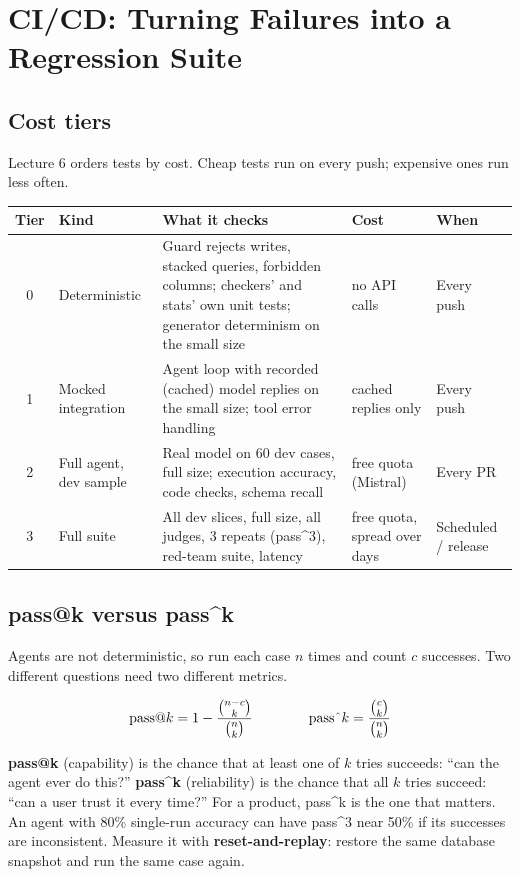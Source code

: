 \documentclass[11pt,a4paper]{article}
\begin{document}
\section{CI/CD: Turning Failures into a Regression Suite}

\subsection{Cost tiers}

Lecture 6 orders tests by cost. Cheap tests run on every push; expensive ones run less often.

\begin{center}
\small
\begin{tabularx}{\linewidth}{@{}c l X l l@{}}
\toprule
\textbf{Tier} & \textbf{Kind} & \textbf{What it checks} & \textbf{Cost} & \textbf{When}\\
\midrule
0 & Deterministic & Guard rejects writes, stacked queries, forbidden columns; checkers' and stats' own unit tests; generator determinism on the small size & no API calls & Every push\\
1 & Mocked integration & Agent loop with recorded (cached) model replies on the small size; tool error handling & cached replies only & Every push\\
2 & Full agent, dev sample & Real model on 60 dev cases, full size; execution accuracy, code checks, schema recall & free quota (Mistral) & Every PR\\
3 & Full suite & All dev slices, full size, all judges, 3 repeats (pass\^{}3), red-team suite, latency & free quota, spread over days & Scheduled / release\\
\bottomrule
\end{tabularx}
\end{center}

\subsection{pass@k versus pass\^{}k}

Agents are not deterministic, so run each case $n$ times and count $c$ successes. Two different
questions need two different metrics.

\[
\text{pass@}k = 1 - \frac{\binom{n-c}{k}}{\binom{n}{k}}
\qquad\qquad
\text{pass\^{}}k = \frac{\binom{c}{k}}{\binom{n}{k}}
\]

\textbf{pass@k} (capability) is the chance that at least one of $k$ tries succeeds: ``can the
agent ever do this?'' \textbf{pass\^{}k} (reliability) is the chance that all $k$ tries succeed:
``can a user trust it every time?'' For a product, pass\^{}k is the one that matters. An agent
with 80\% single-run accuracy can have pass\^{}3 near 50\% if its successes are inconsistent.
Measure it with \textbf{reset-and-replay}: restore the same database snapshot and run the same
case again.
\end{document}
